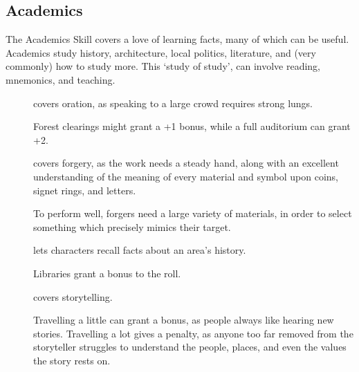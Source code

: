 \begin{multicols}{2}
\subsection{Academics}

The Academics Skill covers a love of learning facts, many of which can be useful.
Academics study history, architecture, local politics, literature, and (very commonly) how to study more.
This `study of study', can involve reading, mnemonics, and teaching.


\begin{description}
  \item[]
    covers oration, as speaking to a large crowd requires strong lungs.

    Forest clearings might grant a +1 bonus, while a full auditorium can grant +2.
  \item[]
    covers forgery, as the work needs a steady hand, along with an excellent understanding of the meaning of every material and symbol upon coins, signet rings, and letters.

    To perform well, forgers need a large variety of materials, in order to select something which precisely mimics their target.
  \item[]
    lets characters recall facts about an area's history.

    Libraries grant a bonus to the roll.
  \item[]
    covers storytelling.

    Travelling a little can grant a bonus, as people always like hearing new stories.
    Travelling a lot gives a penalty, as anyone too far removed from the storyteller struggles to understand the people, places, and even the values the story rests on.
\end{description}


\end{multicols}
